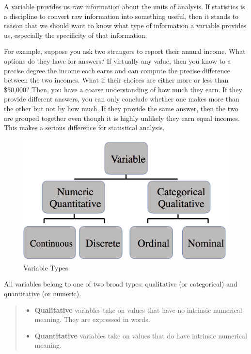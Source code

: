 \documentclass[
]{book}
\providecommand{\tightlist}{%
  \setlength{\itemsep}{0pt}\setlength{\parskip}{0pt}}
\begin{document}
A variable provides us raw information about the units of analysis. If statistics is a discipline to convert raw information into something useful, then it stands to reason that we should want to know what type of information a variable provides us, especially the specificity of that information.

For example, suppose you ask two strangers to report their annual income. What options do they have for answers? If virtually any value, then you know to a precise degree the income each earns and can compute the precise difference between the two incomes. What if their choices are either more or less than \$50,000? Then, you have a coarse understanding of how much they earn. If they provide different answers, you can only conclude whether one makes more than the other but not by how much. If they provide the same answer, then the two are grouped together even though it is highly unlikely they earn equal incomes. This makes a serious difference for statistical analysis.

\begin{figure}

{\centering \includegraphics[width=\textwidth]{images/variables} 

}

\caption{Variable Types}\label{fig:vartypefig}
\end{figure}

All variables belong to one of two broad types: qualitative (or categorical) and quantitative (or numeric).

\begin{quote}
\begin{itemize}
\tightlist
\item
  \textbf{Qualitative} variables take on values that have no intrinsic numerical meaning. They are expressed in words.
\item
  \textbf{Quantitative} variables take on values that do have intrinsic numerical meaning.
\end{itemize}
\end{quote}
\end{document}
